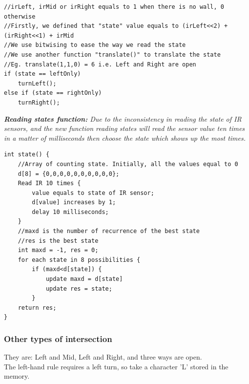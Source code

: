 \documentclass{article}
\begin{document}
\begin{lstlisting}[style=CStyle]
//irLeft, irMid or irRight equals to 1 when there is no wall, 0 otherwise
//Firstly, we defined that "state" value equals to (irLeft<<2) + (irRight<<1) + irMid
//We use bitwising to ease the way we read the state
//We use another function "translate()" to translate the state
//Eg. translate(1,1,0) = 6 i.e. Left and Right are open
if (state == leftOnly)
	turnLeft();
else if (state == rightOnly)
	turnRight();
\end{lstlisting}
\textit{\textbf{Reading states function:} Due to the inconsistency in reading the state of IR sensors, and the new function reading states will read the sensor value ten times in a matter of milliseconds then choose the state which shows up the most times.}
\begin{lstlisting}[style=CStyle]
int state() {
	//Array of counting state. Initially, all the values equal to 0
	d[8] = {0,0,0,0,0,0,0,0,0,0}; 
	Read IR 10 times {
		value equals to state of IR sensor;
		d[value] increases by 1;
		delay 10 milliseconds;
	}
	//maxd is the number of recurrence of the best state
	//res is the best state
	int maxd = -1, res = 0;
	for each state in 8 possibilities {
		if (maxd<d[state]) {
			update maxd = d[state]
			update res = state;
		}
	return res;
}
\end{lstlisting}

\subsubsection{Other types of intersection}
They are: Left and Mid, Left and Right, and three ways are open.\\
The left-hand rule requires a left turn, so take a character 'L' stored in the memory.
\end{document}
